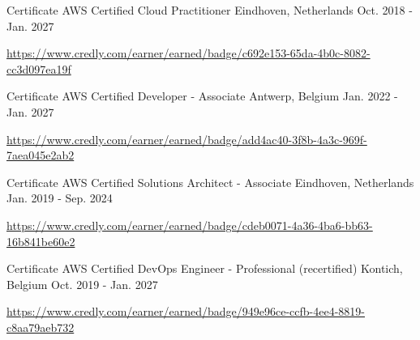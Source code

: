 

\begin{cventries}

  \cventry
    {Certificate} %
    {AWS Certified Cloud Practitioner} %
    {Eindhoven, Netherlands} %
    {Oct. 2018 - Jan. 2027} %
    {
      \begin{cvitems} %
        \item \url{https://www.credly.com/earner/earned/badge/c692e153-65da-4b0c-8082-cc3d097ea19f}
      \end{cvitems}
    }

  \cventry
    {Certificate} %
    {AWS Certified Developer - Associate} %
    {Antwerp, Belgium} %
    {Jan. 2022 - Jan. 2027} %
    {
      \begin{cvitems} %
        \item \url{https://www.credly.com/earner/earned/badge/add4ac40-3f8b-4a3c-969f-7aea045e2ab2}
      \end{cvitems}
    }

  \cventry
    {Certificate} %
    {AWS Certified Solutions Architect - Associate} %
    {Eindhoven, Netherlands} %
    {Jan. 2019 - Sep. 2024} %
    {
      \begin{cvitems} %
        \item \url{https://www.credly.com/earner/earned/badge/cdeb0071-4a36-4ba6-bb63-16b841be60e2}
      \end{cvitems}
    }

  \cventry
    {Certificate} %
    {AWS Certified DevOps Engineer - Professional (recertified)} %
    {Kontich, Belgium} %
    {Oct. 2019 - Jan. 2027} %
    {
      \begin{cvitems} %
        \item \url{https://www.credly.com/earner/earned/badge/949e96ce-ccfb-4ee4-8819-c8aa79aeb732}
      \end{cvitems}
    }


\end{cventries}
